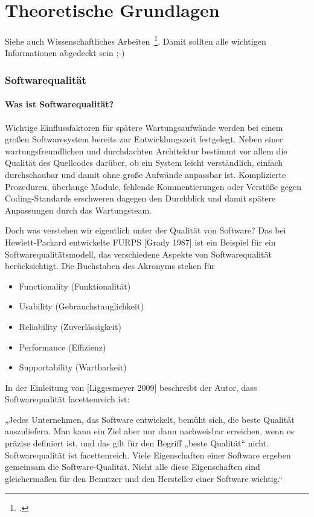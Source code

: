 \newpage
\chapter{Theoretische Grundlagen}
Siehe auch Wissenschaftliches Arbeiten~\footcite[Vgl. ][Seite 1]{Balzert.2008}. Damit sollten alle wichtigen Informationen abgedeckt sein ;-)

\subsection{Softwarequalität}
\subsubsection{Was ist Softwarequalität?} %
Wichtige Einflussfaktoren für spätere Wartungsaufwände werden bei einem großen Softwaresystem bereits zur Entwicklungszeit festgelegt. Neben einer wartungsfreundlichen und durchdachten Architektur
bestimmt vor allem die Qualität des Quellcodes darüber, ob ein System leicht verständlich, einfach durchschaubar und damit ohne große Aufwände anpassbar ist. Komplizierte Prozeduren, überlange Module, fehlende
Kommentierungen oder Verstöße gegen Coding-Standards erschweren dagegen den Durchblick und damit spätere Anpassungen durch das Wartungsteam.

Doch was verstehen wir eigentlich unter der Qualität von Software? Das bei Hewlett-Packard entwickelte FURPS [Grady 1987] ist ein Beispiel für ein Softwarequalitätsmodell, 
das verschiedene Aspekte von Softwarequalität berücksichtigt. Die Buchstaben des Akronyms stehen für 
\begin{itemize}
	\item Functionality (Funktionalität)
	\item Usability (Gebrauchstauglichkeit)
	\item Reliability (Zuverlässigkeit)
	\item Performance (Effizienz)
	\item Supportability (Wartbarkeit)
\end{itemize}

In der Einleitung von [Liggesmeyer 2009] beschreibt der Autor, dass Softwarequalität facettenreich ist:

„Jedes Unternehmen, das Software entwickelt, bemüht sich, die beste Qualität auszuliefern. Man kann ein Ziel aber nur dann nachweisbar erreichen, wenn es präzise definiert ist, und das gilt für den Begriff „beste Qualität“ nicht. Softwarequalität ist facettenreich. Viele Eigenschaften einer Software ergeben gemeinsam die Software-Qualität. Nicht alle diese Eigenschaften sind gleichermaßen für den Benutzer und den
Hersteller einer Software wichtig.“

